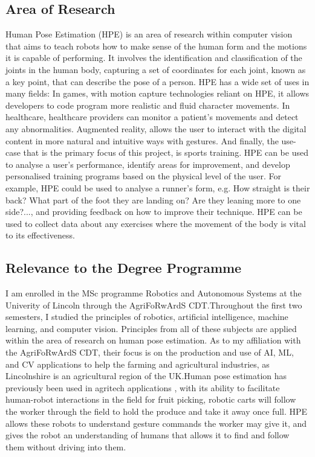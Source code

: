 \documentclass[runningheads]{llncs}
\begin{document}
    \subsection{Area of Research}
        Human Pose Estimation (HPE) is an area of research within computer vision that aims to teach robots how to make sense of the human form and the motions it is capable of performing. It involves the identification and classification of the joints in the human body, capturing a set of coordinates for each joint, known as a key point, that can describe the pose of a person. HPE has a wide set of uses in many fields: In games, with motion capture technologies reliant on HPE, it allows developers to code program more realistic and fluid character movements. In healthcare, healthcare providers can monitor a patient's movements and detect any abnormalities. Augmented reality, allows the user to interact with the digital content in more natural and intuitive ways with gestures. And finally, the use-case that is the primary focus of this project, is sports training. HPE can be used to analyse a user's performance, identify areas for improvement, and develop personalised training programs based on the physical level of the user. For example, HPE could be used to analyse a runner's form, e.g. How straight is their back? What part of the foot they are landing on? Are they leaning more to one side?..., and providing feedback on how to improve their technique. HPE can be used to collect data about any exercises where the movement of the body is vital to its effectiveness.
    
    \subsection{Relevance to the Degree Programme}
        I am enrolled in the MSc programme Robotics and Autonomous Systems at the Univerity of Lincoln through the AgriFoRwArdS CDT.\@ Throughout the first two semesters, I studied the principles of robotics, artificial intelligence, machine learning, and computer vision. Principles from all of these subjects are applied within the area of research on human pose estimation. As to my affiliation with the AgriFoRwArdS CDT, their focus is on the production and use of AI, ML, and CV applications to help the farming and agricultural industries, as Lincolnshire is an agricultural region of the UK.\@ Human pose estimation has previously been used in agritech applications \parencite{app12168160}, with its ability to facilitate human-robot interactions in the field for fruit picking, robotic carts will follow the worker through the field to hold the produce and take it away once full. HPE allows these robots to understand gesture commands the worker may give it, and gives the robot an understanding of humans that allows it to find and follow them without driving into them.
        
\end{document}
